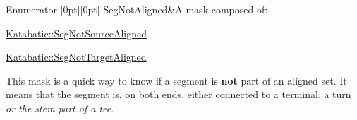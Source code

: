 \begin{DoxyEnumFields}{Enumerator}
[0pt][0pt]{}\mbox{\label{namespaceKatabatic_a94585537ee1724ea9315578ec54380f4a637e0426170a532feac45548e009325d}} 
Seg\+Not\+Aligned&A mask composed of\+:
\begin{DoxyItemize}
\item \hyperlink{namespaceKatabatic_a94585537ee1724ea9315578ec54380f4a286b96fc8ab2377a2caf92c82352b0c8}{Katabatic\+::\+Seg\+Not\+Source\+Aligned}
\item \hyperlink{namespaceKatabatic_a94585537ee1724ea9315578ec54380f4ac5042810c9268798def84444d31968ea}{Katabatic\+::\+Seg\+Not\+Target\+Aligned}
\end{DoxyItemize}

This mask is a quick way to know if a segment is {\bfseries not} part of an aligned set. It means that the segment is, on both ends, either connected to a terminal, a turn {\itshape or the stem part of a tee}. \\
\hline

\end{DoxyEnumFields}
